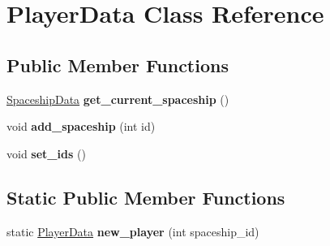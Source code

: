 \hypertarget{class_player_data}{}\section{Player\+Data Class Reference}
\label{class_player_data}
\subsection*{Public Member Functions}
\begin{DoxyCompactItemize}
\item 
\mbox{\label{class_player_data_a691f1547f6a37b84fdea47ca0dd52442}} 
\hyperlink{class_spaceship_data}{Spaceship\+Data} {\bfseries get\+\_\+current\+\_\+spaceship} ()
\item 
\mbox{\label{class_player_data_aa0698be7705e842f89f2446efa9a6697}} 
void {\bfseries add\+\_\+spaceship} (int id)
\item 
\mbox{\label{class_player_data_af76e093858c19962061cf698fd8ba51f}} 
void {\bfseries set\+\_\+ids} ()
\end{DoxyCompactItemize}
\subsection*{Static Public Member Functions}
\begin{DoxyCompactItemize}
\item 
\mbox{\label{class_player_data_ad4848c807b599800703d778afd12409e}} 
static \hyperlink{class_player_data}{Player\+Data} {\bfseries new\+\_\+player} (int spaceship\+\_\+id)
\end{DoxyCompactItemize}
